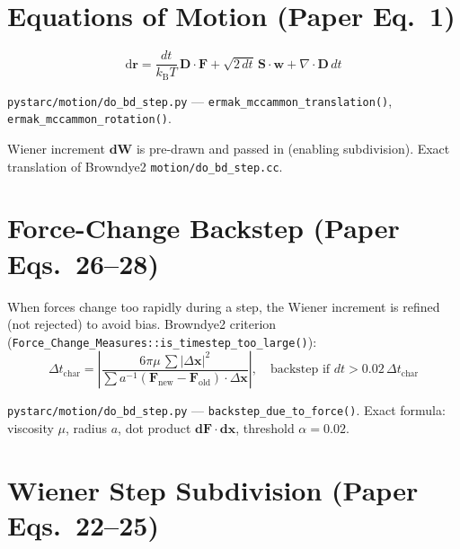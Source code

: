 \documentclass[12pt,a4paper]{article}
\newcommand{\kBT}{k_{\mathrm{B}}T}
\newcommand{\OK}{\textcolor{cgreen}{\checkmark}}
\begin{document}
\section{Equations of Motion (Paper Eq.~1)}

\begin{equation}
\mathrm{d}\mathbf{r} = \frac{dt}{\kBT}\,\mathbf{D}\cdot\mathbf{F}
+\sqrt{2\,dt}\,\mathbf{S}\cdot\mathbf{w}
+\nabla\cdot\mathbf{D}\,dt
\label{eq:master}
\end{equation}

\begin{samebox}
\texttt{pystarc/motion/do\_bd\_step.py} --- \texttt{ermak\_mccammon\_translation()},
\texttt{ermak\_mccammon\_rotation()}.

Wiener increment $\mathbf{dW}$ is pre-drawn and passed in (enabling subdivision).
Exact translation of Browndye2 \texttt{motion/do\_bd\_step.cc}. \OK
\end{samebox}

\section{Force-Change Backstep (Paper Eqs.~26--28)}

When forces change too rapidly during a step, the Wiener increment is
refined (not rejected) to avoid bias.  Browndye2 criterion
(\texttt{Force\_Change\_Measures::is\_timestep\_too\_large()}):
\begin{equation}
\Delta t_\mathrm{char} = \left|\frac{6\pi\mu\,\sum|\Delta\mathbf{x}|^2}
{\sum a^{-1}(\mathbf{F}_\mathrm{new}-\mathbf{F}_\mathrm{old})\cdot\Delta\mathbf{x}}\right|,
\quad\text{backstep if } dt > 0.02\,\Delta t_\mathrm{char}
\label{eq:forceback}
\end{equation}

\begin{samebox}
\texttt{pystarc/motion/do\_bd\_step.py} --- \texttt{backstep\_due\_to\_force()}.
Exact formula: viscosity $\mu$, radius $a$, dot product $\mathbf{dF}\cdot\mathbf{dx}$,
threshold $\alpha=0.02$. \OK
\end{samebox}

\section{Wiener Step Subdivision (Paper Eqs.~22--25)}
\end{document}
